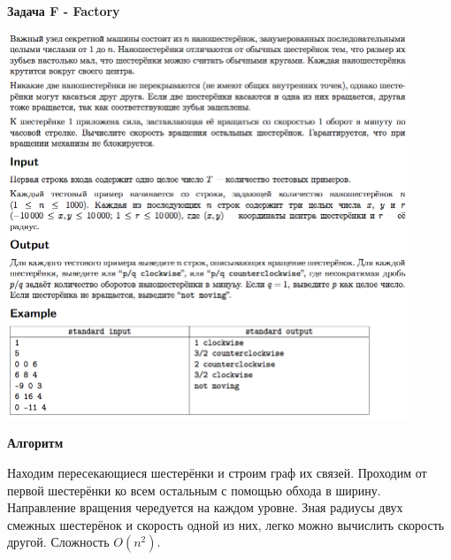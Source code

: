 \documentclass[a4paper,12pt]{article}
\begin{document}
\newpage
\textbf{{\large Задача F - Factory}}

\begin{center}
\includegraphics[width=0.9\textwidth]{OC_Europe/OC_Europe_F.png}\\ [1cm]
\end{center}

\newpage
\textbf{{\large Алгоритм}}

Находим пересекающиеся шестерёнки и строим граф их связей. Проходим от первой шестерёнки ко всем остальным с помощью обхода в ширину. Направление вращения чередуется на каждом уровне. Зная радиусы двух смежных шестерёнок и скорость одной из них, легко можно вычислить скорость другой. Сложность $O(n^2)$. \\
\end{document}
